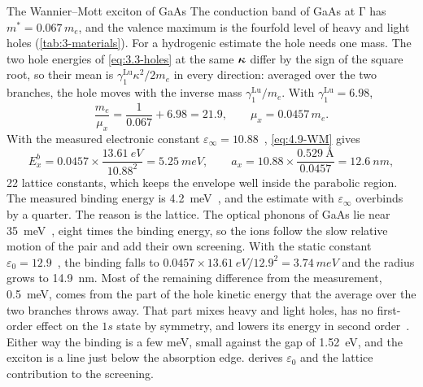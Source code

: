 \begin{workedexample}{The Wannier--Mott exciton of GaAs}\label{we:4-gaasexciton}
The conduction band of GaAs at $\mathrm{\Gamma}$ has $m^* = 0.067\,m_e$, and the valence maximum is the fourfold level of heavy and light holes (\cref{tab:3-materials}). For a hydrogenic estimate the hole needs one mass. The two hole energies of \cref{eq:3.3-holes} at the same $\bm{\kappa}$ differ by the sign of the square root, so their mean is $\gamma^{\mathrm{Lu}}_1\kappa^2/2m_e$ in every direction: averaged over the two branches, the hole moves with the inverse mass $\gamma^{\mathrm{Lu}}_1/m_e$. With $\gamma^{\mathrm{Lu}}_1 = 6.98$,
\begin{equation*}
  \frac{m_e}{\mu_x} = \frac{1}{0.067} + 6.98 = 21.9, \qquad \mu_x = 0.0457\,m_e .
\end{equation*}
With the measured electronic constant $\varepsilon_\infty = 10.88$~\cite{lockwood2005optical}, \cref{eq:4.9-WM} gives
\begin{equation*}
  E_x^b = 0.0457\times\frac{\SI{13.61}{eV}}{10.88^2} = \SI{5.25}{meV}, \qquad a_x = 10.88\times\frac{\SI{0.529}{\angstrom}}{0.0457} = \SI{12.6}{nm} ,
\end{equation*}
22 lattice constants, which keeps the envelope well inside the parabolic region. The measured binding energy is \SI{4.2}{meV}~\cite{sell1972resolved}, and the estimate with $\varepsilon_\infty$ overbinds by a quarter. The reason is the lattice. The optical phonons of GaAs lie near \SI{35}{meV}~\cite[Fig.~2]{griffin2018directional}, eight times the binding energy, so the ions follow the slow relative motion of the pair and add their own screening. With the static constant $\varepsilon_0 = 12.9$~\cite[Table~I]{griffin2018directional}, the binding falls to $0.0457\times\SI{13.61}{eV}/12.9^2 = \SI{3.74}{meV}$ and the radius grows to \SI{14.9}{nm}. Most of the remaining difference from the measurement, \SI{0.5}{meV}, comes from the part of the hole kinetic energy that the average over the two branches throws away. That part mixes heavy and light holes, has no first-order effect on the $1s$ state by symmetry, and lowers its energy in second order~\cite{baldereschi1971energy}. Either way the binding is a few meV, small against the gap of \SI{1.52}{eV}, and the exciton is a line just below the absorption edge.  derives $\varepsilon_0$ and the lattice contribution to the screening.
\end{workedexample}

